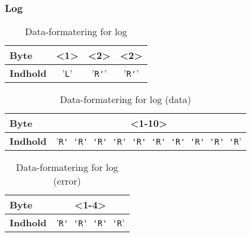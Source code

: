 \subsubsection{Log}

\begin{table}[h]
	\caption{Data-formatering for log}
	\centering
	\begin{tabular}{|l|c|c|c|}
		\hline 
		\textbf{Byte} & \textbf{<1>} & \textbf{<2>} & \textbf{<2>}  \\ 
		\hline 
		\textbf{Indhold} & '\verb+L+' & '\verb+R'+' & '\verb+R'+' \\ 
		\hline 
	\end{tabular} 
	\label{table:SWProtokol-para}
\end{table}


\begin{table}[h]
	\caption{Data-formatering for log (data)}
	\centering
	\begin{tabular}{|l|c|}
		\hline 
		\textbf{Byte} & \textbf{<1-10>}  \\ 
		\hline 
		\textbf{Indhold}  & '\verb+R' 'R' 'R' 'R' 'R' 'R' 'R' 'R' 'R' 'R+'  \\ 
		\hline 
	\end{tabular} 
	\label{table:SWProtokol-para}
\end{table}



\begin{table}[h]
	\caption{Data-formatering for log (error)}
	\centering
	\begin{tabular}{|l|c|}
		\hline 
		\textbf{Byte} & \textbf{<1-4>}  \\ 
		\hline 
		\textbf{Indhold}  & '\verb+R' 'R' 'R' 'R+'  \\ 
		\hline 
	\end{tabular} 
	\label{table:SWProtokol-para}
\end{table}












